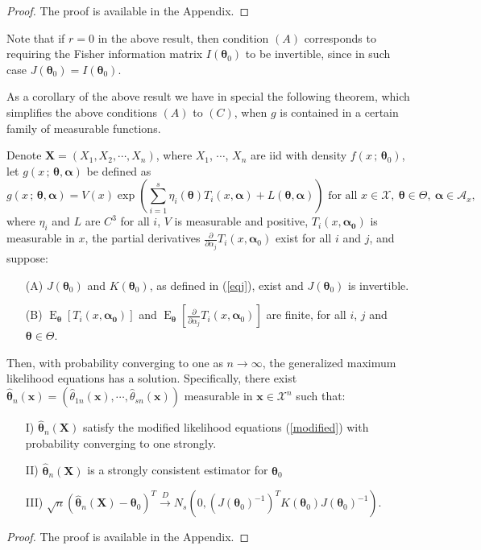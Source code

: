 \documentclass[lineno]{biometrika}
\newcommand{\f}{\operatorname}
\newcommand{\bs}{\boldsymbol}
\begin{document}
\begin{proof} The proof is available in the Appendix.
 \end{proof}

Note that if $r=0$ in the above result, then condition $(A)$ corresponds to requiring the Fisher information matrix $I(\bs{\theta}_0)$ to be invertible, since in such case $J(\bs{\theta}_0)=I(\bs{\theta}_0)$.

As a corollary of the above result we have in special the following theorem, which simplifies the above conditions $(A)$ to $(C)$, when $g$ is contained in a certain family of measurable functions.

\begin{theorem}\label{princ} Denote $\bs{X}=\left(X_1, X_2, \cdots, X_n\right)$, where $X_1$, $\cdots$, $X_n$ are iid with density $f(x\,;\,\bs{\theta}_0)$, let $g(x\,;\,\bs{\theta},\bs{\alpha})$ be defined as
\begin{equation*}g(x\,;\,\bs{\theta},\bs{\alpha})=V(x)\exp\left(\sum_{i=1}^s \eta_i(\bs{\theta})T_i(x,\bs{\alpha})+L(\bs{\theta},\bs{\alpha})\right)\mbox{ for all }x\in \mathcal{X},\ \bs{\theta}\in \Theta,\ \bs{\alpha}\in \mathcal{A}_x,
\end{equation*}
where $\eta_i$ and $L$ are $C^3$ for all $i$, $V$ is  measurable and positive,  $T_i(x,\bs{\alpha_0})$ is measurable in $x$, the partial derivatives $\frac{\partial}{\partial \alpha_j} T_i(x,\bs{\alpha}_0)$ exist for all $i$ and $j$, and suppose:
\begin{itemize}
\item[(A)]  $J(\bs{\theta}_0)$ and $K(\bs{\theta}_0)$, as defined in (\ref{eqj}), exist and $J(\bs{\theta}_0)$ is invertible.
\item[(B)] $\f{E}_{\bs{\theta}}\left[T_i(x,\bs{\alpha_0})\right]$ and $\f{E}_{\bs{\theta}}\left[\frac{\partial}{\partial \alpha_j} T_i(x,\bs{\alpha}_0)\right]$ are finite, for all $i$, $j$ and $\bs{\theta}\in \Theta$.
\end{itemize}
Then, with probability converging to one as $n\to \infty$, the generalized maximum likelihood equations has a solution. Specifically, there exist  $\bs{\hat{\theta}}_n(\bs{x})=(\hat{\theta}_{1n}(\bs{x}),\cdots,\hat{\theta}_{sn}(\bs{x}))$ measurable in $\bs{x}\in \mathcal{X}^n$ such that:
\begin{itemize}
\item[I)] $\bs{\hat{\theta}}_n(\bs{X})$ satisfy the modified likelihood equations (\ref{modified}) with probability converging to one strongly.
\item[II)] $\bs{\hat{\theta}}_n(\bs{X})$ is a strongly consistent estimator for $\bs{\theta}_0$
\item[III)]
$\sqrt{n}(\bs{\hat{\theta}}_n(\bs{X})-\bs{\theta}_0)^T\overset{D}{\to} N_s\left(0,(J(\bs{\theta}_0)^{-1})^T K(\bs{\theta}_0)J(\bs{\theta}_0)^{-1}\right)$.
\end{itemize}
\end{theorem}
\begin{proof} The proof is available in the Appendix.
 \end{proof}
\end{document}
